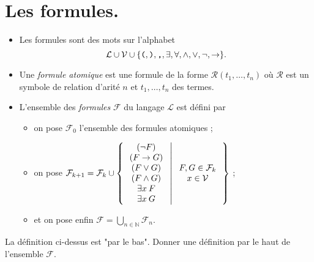 \documentclass[./main]{subfiles}
\begin{document}
  \section{Les formules.}

  \begin{defn}
    \begin{itemize}
      \item Les formules sont des mots sur l'alphabet \[ \mathcal{L} \cup \mathcal{V} \cup \{\verb|(|, \verb|)|, \verb|,|, \exists, \forall, \land, \lor, \lnot, \to \} .\] 
      \item Une \textit{formule atomique} est une formule de la forme $\mathcal{R}(t_1, \ldots, t_n)$ où $\mathcal{R}$ est un symbole de relation d'arité $n$ et $t_1, \ldots, t_n$ des termes.
      \item L'ensemble des \textit{formules} $\mathcal{F}$ du langage $\mathcal{L}$ est défini par 
        \begin{itemize}
          \item on pose $\mathcal{F}_0$ l'ensemble des formules atomiques ;
          \item on pose $\mathcal{F}_{k+1} = \mathcal{F}_k \cup \mleft\{\,
              \begin{array}{c}
                (\lnot F)\\
                (F \to G)\\
                (F \lor G)\\
                (F \land G)\\
                \exists x\: F\\
                \exists x\: G\\
              \end{array}
            \;\middle|\; 
            \begin{array}{c}
              F,G \in \mathcal{F}_k\\
              x \in \mathcal{V}
            \end{array}
          \,\mright\}$ ;
        \item et on pose enfin $\mathcal{F} = \bigcup_{n \in \mathds{N}} \mathcal{F}_n$.
        \end{itemize}
    \end{itemize}
  \end{defn}

  \begin{exo}
    La définition ci-dessus est "par le bas". Donner une définition par le haut de l'ensemble $\mathcal{F}$.
  \end{exo}
\end{document}
